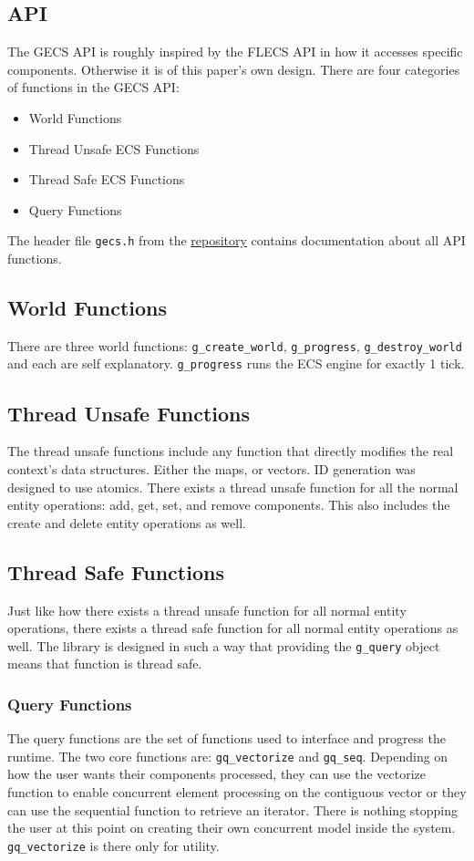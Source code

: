 \subsection{API}
The GECS API is roughly inspired by the FLECS API in how it accesses specific components. Otherwise it is of this paper's own design. There are four categories of functions in the GECS API:
\begin{itemize}
    \item World Functions
    \item Thread Unsafe ECS Functions
    \item Thread Safe ECS Functions
    \item Query Functions
\end{itemize}

The header file \texttt{gecs.h} from the \href{https://github.com/EmilChoparinov/GECS}{repository} contains documentation about all API functions.

\subsection{World Functions}
There are three world functions: \texttt{g\_create\_world}, \texttt{g\_progress}, \texttt{g\_destroy\_world} and each are self explanatory. \texttt{g\_progress} runs the ECS engine for exactly 1 tick.

\subsection{Thread Unsafe Functions}
The thread unsafe functions include any function that directly modifies the real context's data structures. Either the maps, or vectors. ID generation was designed to use atomics. There exists a thread unsafe function for all the normal entity operations: add, get, set, and remove components. This also includes the create and delete entity operations as well.  

\subsection{Thread Safe Functions}
Just like how there exists a thread unsafe function for all normal entity operations, there exists a thread safe function for all normal entity operations as well. The library is designed in such a way that providing the \texttt{g\_query} object means that function is thread safe.

\subsubsection{Query Functions}
The query functions are the set of functions used to interface and progress the runtime. The two core functions are: \texttt{gq\_vectorize} and \texttt{gq\_seq}. Depending on how the user wants their components processed, they can use the vectorize function to enable concurrent element processing on the contiguous vector or they can use the sequential function to retrieve an iterator. There is nothing stopping the user at this point on creating their own concurrent model inside the system. \texttt{gq\_vectorize} is there only for utility.

